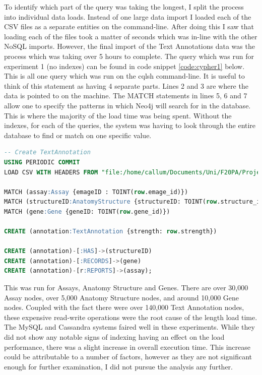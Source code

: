 To identify which part of the query was taking the longest, I split the process into individual data loads. Instead of one large data import I loaded each of the CSV files as a separate entities on the command-line. After doing this I saw that loading each of the files took a matter of seconds which was in-line with the other NoSQL imports. However, the final import of the Text Annotations data was the process which was taking over 5 hours to complete. The query which was run for experiment 1 (no indexes) can be found in code snippet \ref{code:cypher1} below. This is all one query which was run on the cqlsh command-line. It is useful to think of this statement as having 4 separate parts. Lines 2 and 3 are where the data is pointed to on the machine. The MATCH statements in lines 5, 6 and 7 allow one to specify the patterns in which Neo4j will search for in the database. This is where the majority of the load time was being spent. Without the indexes, for each of the queries, the system was having to look through the entire database to find or match on one specific value.
\begin{lstlisting}[language=SQL, caption=Cypher file to load text annotations data into the Neo4j data model., label=code:cypher1]
-- Create TextAnnotation
USING PERIODIC COMMIT
LOAD CSV WITH HEADERS FROM "file:/home/callum/Documents/Uni/F20PA/Project/Neo4j/Data/TextAnnotations.csv" AS row

MATCH (assay:Assay {emageID : TOINT(row.emage_id)})
MATCH (structureID:AnatomyStructure {structureID: TOINT(row.structure_id)})
MATCH (gene:Gene {geneID: TOINT(row.gene_id)})

CREATE (annotation:TextAnnotation {strength: row.strength})

CREATE (annotation)-[:HAS]->(structureID)
CREATE (annotation)-[:RECORDS]->(gene)
CREATE (annotation)-[r:REPORTS]->(assay);
\end{lstlisting}

\parindent 0pt
This was run for Assays, Anatomy Structure and Genes. There are over 30,000 Assay nodes, over 5,000 Anatomy Structure nodes, and around 10,000 Gene nodes. Coupled with the fact there were over 140,000 Text Annotation nodes, these expensive read-write operations were the root cause of the length load time.
\parindent 15pt
The MySQL and Cassandra systems faired well in these experiments. While they did not show any notable signs of indexing having an effect on the load performance, there was a slight increase in overall execution time. This increase could be attributable to a number of factors, however as they are not significant enough for further examination, I did not pursue the analysis any further.
